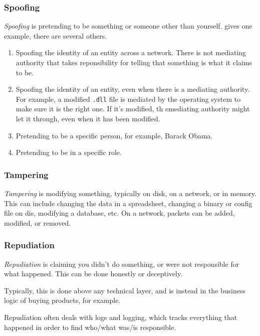 \subsubsection{Spoofing}\label{subsubsec:Spoofing}
\begin{definition}[Spoofing]\label{def:Spoofing}
  \emph{Spoofing} is pretending to be something or someone other than yourself.
   gives one example, there are several others.

  \begin{enumerate}[noitemsep]
  \item Spoofing the identity of an entity across a network.
    There is not mediating authority that takes reponsibility for telling that something is what it claims to be.
  \item Spoofing the identity of an entity, even when there is a mediating authority.
    For example, a modified \texttt{.dll} file is mediated by the operating system to make sure it is the right one.
    If it's modified, th emediating authority might let it through, even when it has been modified.
  \item Pretending to be a specific person, for example, Barack Obama.
  \item Pretending to be in a specific role.
  \end{enumerate}
\end{definition}

\subsubsection{Tampering}\label{subsubsec:Tampering}
\begin{definition}[Tampering]\label{def:Tampering}
  \emph{Tampering} is modifying something, typically on disk, on a network, or in memory.
  This can include changing the data in a spreadsheet, changing a binary or config file on dis, modifying a database, etc.
  On a network, packets can be added, modified, or removed.
\end{definition}

\subsubsection{Repudiation}\label{subsubsec:Repudiation}
\begin{definition}[Repudiation]\label{def:Repudiation}
  \emph{Repudiation} is claiming you didn't do something, or were not responsible for what happened.
  This can be done honestly or deceptively.

  Typically, this is done above any technical layer, and is instead in the business logic of buying products, for example.

  Repudiation often deals with logs and logging, which tracks everything that happened in order to find who/what was/is responsible.
\end{definition}

